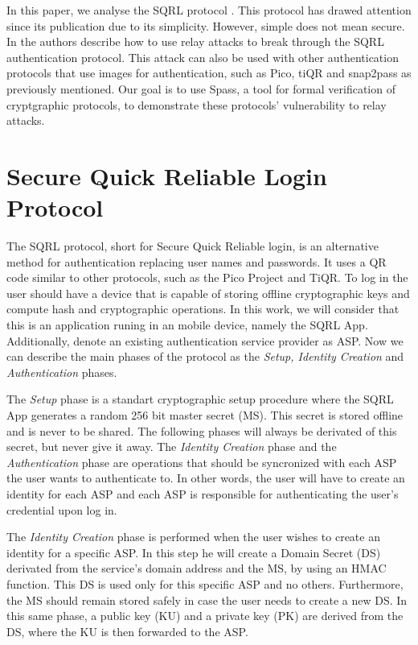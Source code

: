 \documentclass{article}
\begin{document}
	In this paper, we analyse the SQRL protocol \cite{sqrl}. This protocol
	has drawed attention since its publication due to its simplicity. However,
	simple does not mean secure. In \cite{relayattack} the authors
	describe how to use relay attacks to break through the SQRL authentication
	protocol. This attack can also be used with other authentication
	protocols that use images for authentication, such as Pico, tiQR and snap2pass
	as previously mentioned.
	Our goal is to use Spass, a tool for formal verification of cryptgraphic
	protocols, to demonstrate these protocols' vulnerability to relay attacks.

\section{Secure Quick Reliable Login Protocol}

	The SQRL protocol, short for Secure Quick Reliable login, is an alternative method 
	for authentication replacing user names and passwords. It uses a QR code
	similar to other protocols, such as the Pico Project and TiQR. To log in
	the user should have a device that is capable of storing offline cryptographic
	keys and compute hash and cryptographic operations. In this work, we will consider that
	this is an application runing in an mobile device, namely the SQRL App. 
	Additionally, denote an existing authentication service provider as ASP. Now
	we can describe the main phases of the protocol as the \emph{Setup, Identity 
	Creation} and \emph{Authentication} phases.

	The \emph{Setup} phase is a standart cryptographic setup procedure where the
	SQRL App generates a random 256 bit master secret (MS). This secret is stored 
	offline and 
	is never to be shared. The following phases will always be derivated of this
	secret, but never give it away. The \emph{Identity Creation} phase and the
	\emph{Authentication} phase are operations that should be syncronized with
	each ASP the user wants to authenticate to. In other words, the user will
	have to create an identity for each ASP and each ASP is responsible 
	for authenticating the user's credential upon log in.

	The \emph{Identity Creation} phase is performed when the user wishes to create an
	identity for a specific ASP. In this step he will create a Domain Secret (DS)
	derivated from the service's domain address and the MS, by using an HMAC function.
	This DS is used only for this specific ASP and no others. Furthermore, the
	MS should remain stored safely in case the user needs to create a new DS. In 
	this same phase, a public key (KU) and a private key (PK) are derived from the
	DS, where the KU is then forwarded to the ASP.
\end{document}
